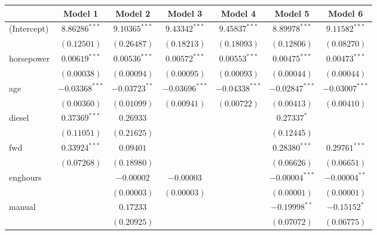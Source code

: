 
\begin{table}
\begin{center}
\begin{footnotesize}
\begin{tabular}{l c c c c c c}
\hline
 & Model 1 & Model 2 & Model 3 & Model 4 & Model 5 & Model 6 \\
\hline
(Intercept) & $8.86286^{***}$  & $9.10365^{***}$ & $9.43342^{***}$  & $9.45837^{***}$  & $8.89978^{***}$  & $9.11582^{***}$  \\
            & $(0.12501)$      & $(0.26487)$     & $(0.18213)$      & $(0.18093)$      & $(0.12806)$      & $(0.08270)$      \\
horsepower  & $0.00619^{***}$  & $0.00536^{***}$ & $0.00572^{***}$  & $0.00553^{***}$  & $0.00475^{***}$  & $0.00473^{***}$  \\
            & $(0.00038)$      & $(0.00094)$     & $(0.00095)$      & $(0.00093)$      & $(0.00044)$      & $(0.00044)$      \\
age         & $-0.03368^{***}$ & $-0.03723^{**}$ & $-0.03696^{***}$ & $-0.04338^{***}$ & $-0.02847^{***}$ & $-0.03007^{***}$ \\
            & $(0.00360)$      & $(0.01099)$     & $(0.00941)$      & $(0.00722)$      & $(0.00413)$      & $(0.00410)$      \\
diesel      & $0.37369^{***}$  & $0.26933$       &                  &                  & $0.27337^{*}$    &                  \\
            & $(0.11051)$      & $(0.21625)$     &                  &                  & $(0.12445)$      &                  \\
fwd         & $0.33924^{***}$  & $0.09401$       &                  &                  & $0.28380^{***}$  & $0.29761^{***}$  \\
            & $(0.07268)$      & $(0.18980)$     &                  &                  & $(0.06626)$      & $(0.06651)$      \\
enghours    &                  & $-0.00002$      & $-0.00003$       &                  & $-0.00004^{***}$ & $-0.00004^{**}$  \\
            &                  & $(0.00003)$     & $(0.00003)$      &                  & $(0.00001)$      & $(0.00001)$      \\
manual      &                  & $0.17233$       &                  &                  & $-0.19998^{**}$  & $-0.15152^{*}$   \\
            &                  & $(0.20925)$     &                  &                  & $(0.07072)$      & $(0.06775)$      \\

\end{tabular}
\end{footnotesize}
\end{center}
\end{table}

